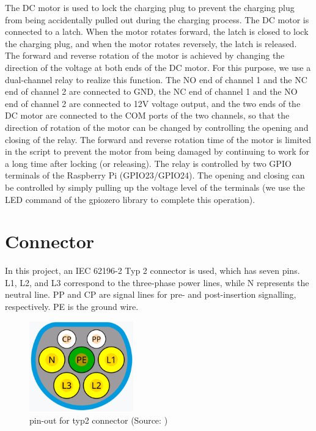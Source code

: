 \documentclass[
	english,
	ruledheaders=section,%
	class=report,%
	thesis={type=Report},%
	accentcolor=9c,%
	custommargins=true,%
	marginpar=false,%
	parskip=half-,%
	fontsize=11pt,%
	logofile={img/tuda_logo.pdf}, %
]{tudapub}
\begin{document}
The DC motor is used to lock the charging plug to prevent the charging plug from being accidentally pulled out during the charging process. The DC motor is connected to a latch. When the motor rotates forward, the latch is closed to lock the charging plug, and when the motor rotates reversely, the latch is released. The forward and reverse rotation of the motor is achieved by changing the direction of the voltage at both ends of the DC motor. For this purpose, we use a dual-channel relay to realize this function. The NO end of channel 1 and the NC end of channel 2 are connected to GND, the NC end of channel 1 and the NO end of channel 2 are connected to 12V voltage output, and the two ends of the DC motor are connected to the COM ports of the two channels, so that the direction of rotation of the motor can be changed by controlling the opening and closing of the relay. The forward and reverse rotation time of the motor is limited in the script to prevent the motor from being damaged by continuing to work for a long time after locking (or releasing). The relay is controlled by two GPIO terminals of the Raspberry Pi (GPIO23/GPIO24). The opening and closing can be controlled by simply pulling up the voltage level of the terminals (we use the LED command of the gpiozero library to complete this operation).

\section{Connector}
\label{sec: connector}



In this project, an IEC 62196-2 Typ 2 connector is used, which has seven pins. L1, L2, and L3 correspond to the three-phase power lines, while N represents the neutral line. \ac{PP} and \ac{CP} are signal lines for pre- and post-insertion signalling, respectively. PE is the ground wire. 

\begin{figure}[H]
    \centering
    \includegraphics[width=0.4\textwidth]{img/pin-out_for_typ2.jpg} %
    \caption{pin-out for typ2 connector
    (Source: \cite{IECStandard})}
    \label{fig:typ2pin-out}
\end{figure}
\end{document}
